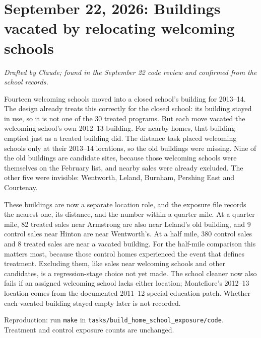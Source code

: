 \section*{September 22, 2026: Buildings vacated by relocating welcoming schools}
\textit{Drafted by Claude; found in the September 22 code review and confirmed from the school records.}

Fourteen welcoming schools moved into a closed school's building for 2013--14.
The design already treats this correctly for the closed school: its building
stayed in use, so it is not one of the 30 treated programs. But each move
vacated the welcoming school's own 2012--13 building. For nearby homes, that
building emptied just as a treated building did. The distance task placed
welcoming schools only at their 2013--14 locations, so the old buildings were
missing. Nine of the old buildings are candidate sites, because those
welcoming schools were themselves on the February list, and nearby sales were
already excluded. The other five were invisible: Wentworth, Leland, Burnham,
Pershing East and Courtenay.

These buildings are now a separate location role, and the exposure file
records the nearest one, its distance, and the number within a quarter mile.
At a quarter mile, 82 treated sales near Armstrong are also near Leland's old
building, and 9 control sales near Hinton are near Wentworth's. At a half
mile, 380 control sales and 8 treated sales are near a vacated building. For
the half-mile comparison this matters most, because those control homes
experienced the event that defines treatment. Excluding them, like sales near
welcoming schools and other candidates, is a regression-stage choice not yet
made. The school cleaner now also fails if an assigned welcoming school lacks
either location; Montefiore's 2012--13 location comes from the documented
2011--12 special-education patch. Whether each vacated building stayed empty
later is not recorded.

\small
Reproduction: run \texttt{make} in \texttt{tasks/build\_home\_school\_exposure/code}.
Treatment and control exposure counts are unchanged.
\normalsize
